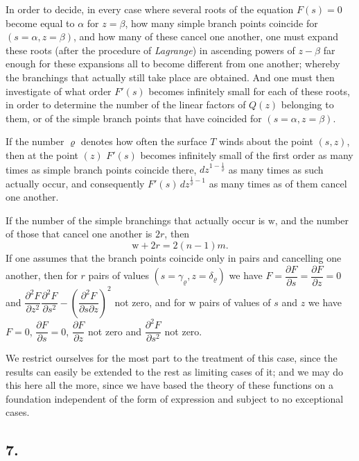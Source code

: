 \documentclass{article}
\begin{document}
In order to decide, in every case where several roots of the equation $F(s) = 0$ become equal to $\alpha$ for $z = \beta$, how many simple branch points coincide for $(s = \alpha, z = \beta)$, and how many of these cancel one another, one must expand these roots (after the procedure of \emph{Lagrange}) in ascending powers of $z-\beta$ far enough for these expansions all to become different from one another; whereby the branchings that actually still take place are obtained. And one must then investigate of what order $F'(s)$ becomes infinitely small for each of these roots, in order to determine the number of the linear factors of $Q(z)$ belonging to them, or of the simple branch points that have coincided for $(s = \alpha, z = \beta)$.

If the number $\varrho$ denotes how often the surface $T$ winds about the point $(s, z)$, then at the point $(z)$ $F'(s)$ becomes infinitely small of the first order as many times as simple branch points coincide there, $dz^{1-\frac{1}{\varrho}}$ as many times as such actually occur, and consequently $F'(s)\, dz^{\frac{1}{\varrho}-1}$ as many times as of them cancel one another.

If the number of the simple branchings that actually occur is $\mathrm{w}$, and the number of those that cancel one another is $2r$, then
\[ \mathrm{w} + 2r = 2(n-1)m. \]
If one assumes that the branch points coincide only in pairs and cancelling one another, then for $r$ pairs of values $(s = \gamma_{\varrho}, z = \delta_{\varrho})$ we have $F = \dfrac{\partial F}{\partial s} = \dfrac{\partial F}{\partial z} = 0$ and $\dfrac{\partial^{2}F}{\partial z^{2}} \dfrac{\partial^{2}F}{\partial s^{2}} - \left(\dfrac{\partial^{2}F}{\partial s \partial z}\right)^{2}$ not zero, and for $\mathrm{w}$ pairs of values of $s$ and $z$ we have $F = 0$, $\dfrac{\partial F}{\partial s} = 0$, $\dfrac{\partial F}{\partial z}$ not zero and $\dfrac{\partial^{2}F}{\partial s^{2}}$ not zero.

We restrict ourselves for the most part to the treatment of this case, since the results can easily be extended to the rest as limiting cases of it; and we may do this here all the more, since we have based the theory of these functions on a foundation independent of the form of expression and subject to no exceptional cases.

\subsection*{7.}
\end{document}
